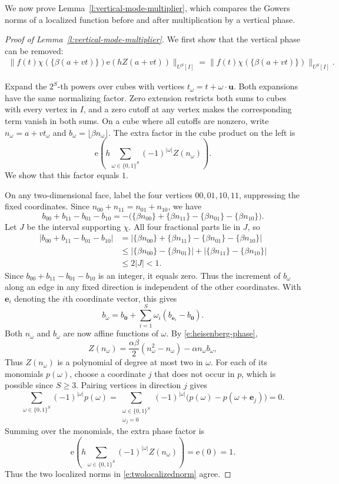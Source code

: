 \documentclass[12pt]{amsart}
\newcommand{\1}{\mathbf 1}
\newcommand{\e}{\mathrm e}
\theoremstyle{definition}
\begin{document}
We now prove Lemma~\ref{l:vertical-mode-multiplier}, which
compares the Gowers norms of a localized function before and
after multiplication by a vertical phase.

\begin{proof}[Proof of Lemma~\ref{l:vertical-mode-multiplier}]
We first show that the vertical phase can be removed:
\begin{align}\label{e:twolocalizednorm}
    \|f(t)\chi(\{\beta(a+vt)\})\e(hZ(a+vt))\|_{U^S[I]}
 =\|f(t)\chi(\{\beta(a+vt)\})\|_{U^S[I]}.
\end{align}

Expand the $2^S$-th powers over cubes with vertices
$t_\omega=t+\omega\cdot\mathbf u$. Both expansions have the same
normalizing factor. Zero extension restricts both sums to cubes
with every vertex in $I$, and a zero cutoff at any vertex makes
the corresponding term vanish in both sums.
 On a cube where all cutoffs are nonzero,
write \(n_\omega=a+vt_\omega\) and
\(b_\omega=\lfloor\beta n_\omega\rfloor\). The extra factor in
the cube product on the left is
\[
 \e\!\left(h\sum_{\omega\in\{0,1\}^S}
                (-1)^{|\omega|}Z(n_\omega)\right).
\]
We show that this factor equals \(1\).

On any two-dimensional face, label the four vertices
\(00,01,10,11\), suppressing the fixed coordinates. Since
\(n_{00}+n_{11}=n_{01}+n_{10}\), we have
\[
 b_{00}+b_{11}-b_{01}-b_{10}
 =-\bigl(\{\beta n_{00}\}+\{\beta n_{11}\}
          -\{\beta n_{01}\}-\{\beta n_{10}\}\bigr).
\]
Let \(J\) be the interval supporting \(\chi\). All four
fractional parts lie in \(J\), so
\[
\begin{aligned}
 |b_{00}+b_{11}-b_{01}-b_{10}|
 &=\bigl|\{\beta n_{00}\}+\{\beta n_{11}\}
          -\{\beta n_{01}\}-\{\beta n_{10}\}\bigr|\\
 &\leq \bigl|\{\beta n_{00}\}-\{\beta n_{01}\}\bigr|
       +\bigl|\{\beta n_{11}\}-\{\beta n_{10}\}\bigr|\\
 &\leq 2|J|<1.
\end{aligned}
\]
Since \(b_{00}+b_{11}-b_{01}-b_{10}\) is an integer, it equals zero.
Thus the increment of \(b_\omega\) along an edge in any fixed
direction is independent of the other coordinates. With
\(\mathbf e_i\) denoting the \(i\)th coordinate vector, this gives
\[
 b_\omega=b_{\mathbf 0}
       +\sum_{i=1}^S\omega_i(b_{\mathbf e_i}-b_{\mathbf 0}).
\]
Both \(n_\omega\) and \(b_\omega\) are now affine functions of
\(\omega\). By \eqref{e:heisenberg-phase},
\[
 Z(n_\omega)
 =\frac{\alpha\beta}{2}(n_\omega^2-n_\omega)
  -\alpha n_\omega b_\omega,
\]
Thus \(Z(n_\omega)\) is a polynomial of degree at most two
in \(\omega\). For each of its monomials \(p(\omega)\), choose a
coordinate \(j\) that does not occur in \(p\), which is possible
since \(S\geq3\). Pairing vertices in direction \(j\) gives
\[
 \sum_{\omega\in\{0,1\}^S}(-1)^{|\omega|}p(\omega)
 =\sum_{\substack{\omega\in\{0,1\}^S\\\omega_j=0}}
   (-1)^{|\omega|}
   \bigl(p(\omega)-p(\omega+\mathbf e_j)\bigr)
 =0.
\]
Summing over the monomials, the extra phase factor is
\[
 \e\!\left(h\sum_{\omega\in\{0,1\}^S}
             (-1)^{|\omega|}Z(n_\omega)\right)=\e(0)=1.
\]
Thus the two localized norms in \eqref{e:twolocalizednorm} agree.


\end{proof}
\end{document}

